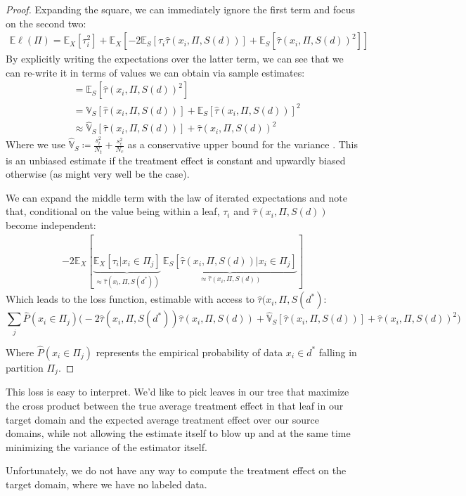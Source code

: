 \documentclass[a4paper,12pt]{article}
\theoremstyle{proposition}
\newcommand{\Ex}{\mathbb{E}}
\newcommand{\TTs}{\hat{\tau}(x_i, \Pi, S(d))}
\newcommand{\Var}{\mathbb{V}}
\begin{document}
\begin{proof} Expanding the square, we can immediately ignore the first term and focus on the second two:
%
\begin{multline*}
\Ex \ell(\Pi) = \Ex_{X} [ \tau_i^2] +  \Ex_{X} [   -2 \Ex_{S}[ \tau_i \TTs] + \Ex_{S}[ \TTs^2 ] ]
\end{multline*}
%
By explicitly writing the expectations over the latter term, we can see that we can re-write it in terms of values we can obtain via sample estimates:
%
\begin{align*}
&= \Ex_{S}[\TTs^2 ]  \\
&=  \Var_{S} [\TTs] +  \Ex_S [\TTs]^2  \\
&\approx  \hat{\Var}_{S} [\TTs] + \TTs ^2
\end{align*}
%
Where we use $\hat{\mathbb{V}}_{S} \coloneqq \frac{s_t^2}{N_t} + \frac{s_c^2}{N_c}$ as a conservative upper bound for the variance \parencite{Imbens2015}. This is an unbiased estimate if the treatment effect is constant and upwardly biased otherwise (as might very well be the case).

We can expand the middle term with the law of iterated expectations and note that, conditional on the value being within a leaf, $\tau_i$ and $\TTs$ become independent:
%
\begin{align*}
-2 \Ex_{X}[ \underbrace{\Ex_{X}[ \tau_i | x_i \in \Pi_j]}_{\approx \hat{\tau}(x_i, \Pi, S(d^*))} \ \underbrace{\Ex_{S}[ \TTs | x_i \in \Pi_j]}_{\approx \hat{\tau}(x_i, \Pi, S(d))}]
\end{align*}
%
Which leads to the loss function, estimable with access to $\hat{\tau}(x_i, \Pi, S(d^*)$:
$$
\sum_j \hat{P}(x_i \in \Pi_j) \bigg( -2 \hat{\tau}(x_i, \Pi, S(d^*)) \TTs  + \hat{\Var}_{S} [\TTs] + \TTs ^2 \bigg)
$$

Where $\hat{P}(x_i \in \Pi_j)$ represents the empirical probability of data $x_i \in d^*$ falling in partition $\Pi_j$.
\end{proof}

This loss is easy to interpret. We'd like to pick leaves in our tree that maximize the cross product between the true average treatment effect in that leaf in our target domain and the expected average treatment effect over our source domains, while not allowing the estimate itself to blow up and at the same time minimizing the variance of the estimator itself.

Unfortunately, we do not have any way to compute the treatment effect on the target domain, where we have no labeled data.
\end{document}

